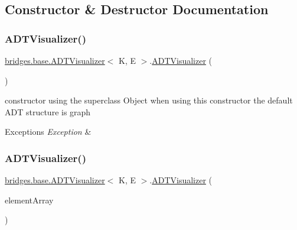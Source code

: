 \subsection{Constructor \& Destructor Documentation}
\hypertarget{classbridges_1_1base_1_1_a_d_t_visualizer_a3d5098e4c0609c19a547f19f0d538eeb}{}\label{classbridges_1_1base_1_1_a_d_t_visualizer_a3d5098e4c0609c19a547f19f0d538eeb} 
\subsubsection{\texorpdfstring{A\+D\+T\+Visualizer()}{ADTVisualizer()}\hspace{0.1cm}{\footnotesize\ttfamily [1/3]}}
{\footnotesize\ttfamily \hyperlink{classbridges_1_1base_1_1_a_d_t_visualizer}{bridges.\+base.\+A\+D\+T\+Visualizer}$<$ K, E $>$.\hyperlink{classbridges_1_1base_1_1_a_d_t_visualizer}{A\+D\+T\+Visualizer} (\begin{DoxyParamCaption}{ }\end{DoxyParamCaption})}

constructor using the superclass Object when using this constructor the default A\+DT structure is graph 
\begin{DoxyExceptions}{Exceptions}
{\em Exception} & \\
\hline
\end{DoxyExceptions}
\hypertarget{classbridges_1_1base_1_1_a_d_t_visualizer_acd2d6c0459173578f4fd95ac4d05cd10}{}\label{classbridges_1_1base_1_1_a_d_t_visualizer_acd2d6c0459173578f4fd95ac4d05cd10} 
\subsubsection{\texorpdfstring{A\+D\+T\+Visualizer()}{ADTVisualizer()}\hspace{0.1cm}{\footnotesize\ttfamily [2/3]}}
{\footnotesize\ttfamily \hyperlink{classbridges_1_1base_1_1_a_d_t_visualizer}{bridges.\+base.\+A\+D\+T\+Visualizer}$<$ K, E $>$.\hyperlink{classbridges_1_1base_1_1_a_d_t_visualizer}{A\+D\+T\+Visualizer} (\begin{DoxyParamCaption}\item[{Array\+Element$<$ E $>$ \mbox{[}$\,$\mbox{]}}]{element\+Array }\end{DoxyParamCaption})}

